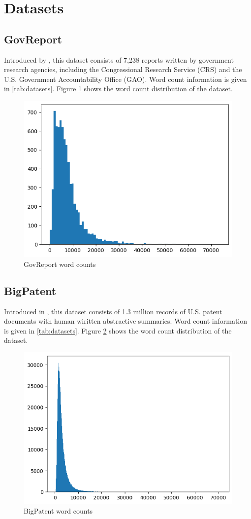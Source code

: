\section{Datasets}
\label{sec:datasets}

\subsection*{GovReport}

Introduced by \citet{huang-etal-2021-efficient}, this dataset consists of 7,238 reports
written by government research agencies, including the Congressional Research Service (CRS)
and the U.S. Government Accountability Office (GAO).
Word count information is given in \autoref{tab:datasets}.
Figure \ref{fig:govreport} shows the word count distribution of the dataset.

\begin{figure}[!ht]
	\centering
	\includegraphics[width=.48\textwidth]{Images/govreport-wordcount.png}
	\caption{GovReport word counts}
	\label{fig:govreport}
\end{figure}


\subsection*{BigPatent}

Introduced in \citet{sharma-etal-2019-bigpatent}, this dataset consists of 1.3 million
records of U.S. patent documents with human wiritten abstractive summaries.
Word count information is given in \autoref{tab:datasets}.
Figure \ref{fig:bigpatent} shows the word count distribution of the dataset.

\begin{figure}[!ht]
	\centering
	\includegraphics[width=.48\textwidth]{Images/bigpatent-wordcount.png}
	\caption{BigPatent word counts}
	\label{fig:bigpatent}
\end{figure}

